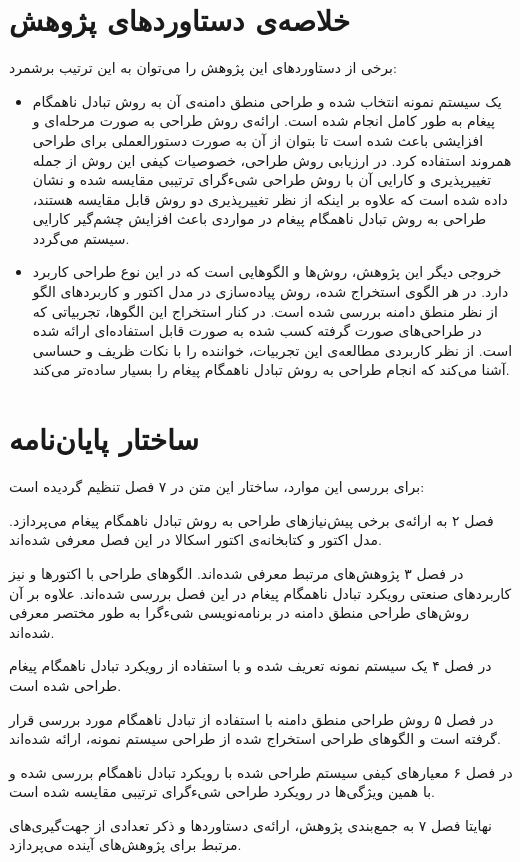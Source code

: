 \section{خلاصه‌ی دستاوردهای پژوهش}
برخی از دستاوردهای این پژوهش را می‌توان به این ترتیب برشمرد:
\begin{itemize}
\item  یک سیستم نمونه انتخاب شده و طراحی منطق دامنه‌ی آن به روش تبادل ناهمگام پیغام به طور کامل انجام شده است. ارائه‌ی روش طراحی به صورت مرحله‌ای و افزایشی باعث شده است تا بتوان از آن به صورت دستورالعملی برای طراحی همروند استفاده کرد. در ارزیابی روش طراحی، خصوصیات کیفی این روش از جمله تغییرپذیری و کارایی آن با روش طراحی شیءگرای ترتیبی مقایسه شده و نشان داده شده است که علاوه بر اینکه از نظر تغییرپذیری دو روش قابل مقایسه هستند، طراحی به روش تبادل ناهمگام پیغام در مواردی باعث افزایش چشم‌گیر کارایی سیستم می‌گردد.
\item خروجی دیگر این پژوهش، روش‌ها و الگوهایی است که در این نوع طراحی کاربرد دارد. در هر الگوی استخراج شده، روش پیاده‌سازی در مدل اکتور و کاربردهای الگو از نظر منطق دامنه بررسی شده است. در کنار استخراج این الگوها، تجربیاتی که در طراحی‌های صورت گرفته کسب شده به صورت قابل استفاده‌ای ارائه شده است. از نظر کاربردی مطالعه‌ی این تجربیات، خواننده را با نکات ظریف و  حساسی آشنا می‌کند که انجام طراحی به روش تبادل ناهمگام پیغام را بسیار ساده‌تر می‌کند.
\end{itemize}
\section{ساختار پایان‌نامه}
برای بررسی این موارد، ساختار این متن در ۷ فصل تنظیم گردیده است:
\begin{strict_itemize}
\item  فصل ۲ به ارائه‌ی برخی پیش‌نیازهای طراحی به روش تبادل ناهمگام پیغام می‌پردازد. مدل اکتور و کتابخانه‌ی اکتور اسکالا در این فصل معرفی شده‌اند.
\item در فصل ۳ پژوهش‌های مرتبط معرفی شده‌اند. الگوهای طراحی با اکتورها و نیز کاربردهای صنعتی رویکرد تبادل ناهمگام پیغام در این فصل بررسی شده‌اند. علاوه بر آن روش‌های طراحی منطق دامنه در برنامه‌نویسی شیءگرا به طور مختصر معرفی شده‌اند.
\item در فصل ۴ یک سیستم نمونه تعریف شده و با استفاده از رویکرد تبادل ناهمگام پیغام طراحی شده است.
\item در فصل ۵ روش طراحی منطق دامنه با استفاده از تبادل ناهمگام مورد بررسی قرار گرفته‌ است و الگوهای طراحی استخراج شده‌ از طراحی سیستم نمونه، ارائه شده‌اند.
\item  در فصل ۶ معیارهای کیفی سیستم طراحی شده با رویکرد تبادل ناهمگام بررسی شده و با همین‌ ویژگی‌ها در رویکرد طراحی شیءگرای ترتیبی مقایسه شده است.
\item نهایتا فصل ۷ به جمع‌بندی پژوهش، ارائه‌ی دستاوردها و ذکر تعدادی از جهت‌گیری‌های مرتبط برای پژوهش‌های آینده می‌پردازد.
\end{strict_itemize}
